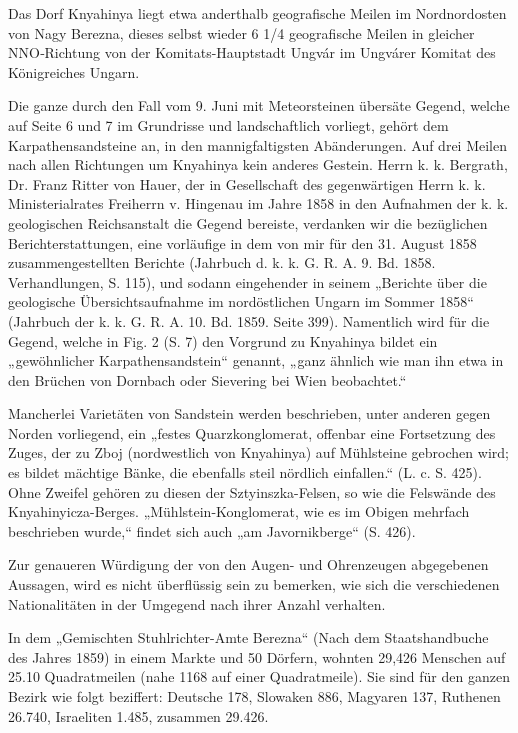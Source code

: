 \documentclass[a4paper, 11pt, oneside, german]{article}
\begin{document}
Das Dorf Knyahinya liegt etwa anderthalb geografische Meilen im Nordnordosten von Nagy Berezna, dieses selbst wieder 6 1/4 geografische Meilen in gleicher NNO‑Richtung von der Komitats-Hauptstadt Ungvár im Ungvárer Komitat des Königreiches Ungarn.

Die ganze durch den Fall vom 9. Juni mit Meteorsteinen übersäte Gegend, welche auf Seite 6 und 7 im Grundrisse und landschaftlich vorliegt, gehört dem Karpathensandsteine an, in den mannigfaltigsten Abänderungen. Auf drei Meilen nach allen Richtungen um Knyahinya kein anderes Gestein. Herrn k. k. Bergrath, Dr. Franz Ritter von Hauer, der in Gesellschaft des gegenwärtigen Herrn k. k. Ministerialrates Freiherrn v. Hingenau im Jahre 1858 in den Aufnahmen der k. k. geologischen Reichsanstalt die Gegend bereiste, verdanken wir die bezüglichen Berichterstattungen, eine vorläufige in dem von mir für den 31. August 1858 zusammengestellten Berichte (Jahrbuch d. k. k. G. R. A. 9. Bd. 1858. Verhandlungen, S. 115), und sodann eingehender in seinem „Berichte über die geologische Übersichtsaufnahme im nordöstlichen Ungarn im Sommer 1858“ (Jahrbuch der k. k. G. R. A. 10. Bd. 1859. Seite 399). Namentlich wird für die Gegend, welche in Fig. 2 (S. 7) den Vorgrund zu Knyahinya bildet ein „gewöhnlicher Karpathensandstein“ genannt, „ganz ähnlich wie man ihn etwa in den Brüchen von Dornbach oder Sievering bei Wien beobachtet.“

Mancherlei Varietäten von Sandstein werden beschrieben, unter anderen gegen Norden vorliegend, ein „festes Quarzkonglomerat, offenbar eine Fortsetzung des Zuges, der zu Zboj (nordwestlich von Knyahinya) auf Mühlsteine gebrochen wird; es bildet mächtige Bänke, die ebenfalls steil nördlich einfallen.“ (L. c. S. 425). Ohne Zweifel gehören zu diesen der Sztyinszka-Felsen, so wie die Felswände des Knyahinyicza-Berges. „Mühlstein-Konglomerat, wie es im Obigen mehrfach beschrieben wurde,“ findet sich auch „am Javornikberge“ (S. 426).

Zur genaueren Würdigung der von den Augen- und Ohrenzeugen abgegebenen Aussagen, wird es nicht überflüssig sein zu bemerken, wie sich die verschiedenen Nationalitäten in der Umgegend nach ihrer Anzahl verhalten.

In dem „Gemischten Stuhlrichter-Amte Berezna“ (Nach dem Staatshandbuche des Jahres 1859) in einem Markte und 50 Dörfern, wohnten 29,426 Menschen auf 25.10 Quadratmeilen (nahe 1168 auf einer Quadratmeile). Sie sind für den ganzen Bezirk wie folgt beziffert: Deutsche 178, Slowaken 886, Magyaren 137, Ruthenen 26.740, Israeliten 1.485, zusammen 29.426.
\end{document}
